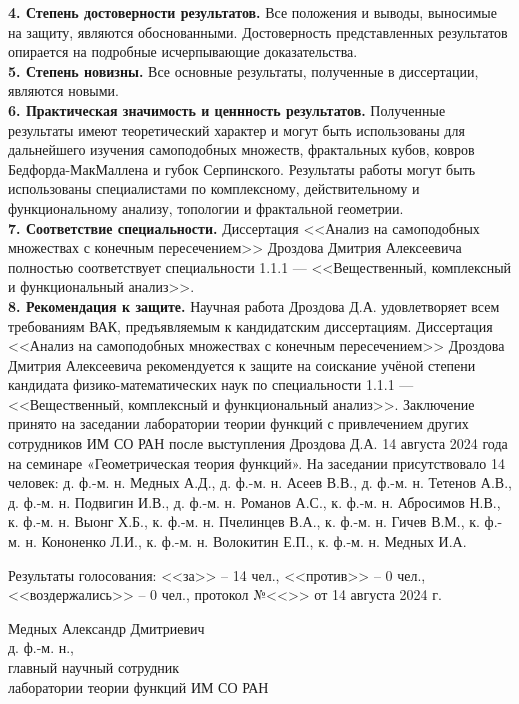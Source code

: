 \documentclass[14pt, a4paper]{extarticle}
\begin{document}
{\bf 4. Степень достоверности результатов.}
Все положения и выводы, выносимые на защиту, являются обоснованными.
Достоверность представленных результатов опирается на подробные исчерпывающие доказательства.\\

{\bf 5. Степень новизны.}
Все основные результаты, полученные в диссертации, являются новыми.\\

{\bf 6. Практическая значимость и ценнность результатов.}
Полученные результаты имеют теоретический характер и могут быть использованы для дальнейшего изучения самоподобных множеств, фрактальных кубов, ковров Бедфорда-МакМаллена и губок Серпинского.
Результаты работы могут быть использованы специалистами по комплексному, действительному и функциональному анализу, топологии и фрактальной геометрии.
\\

{\bf 7. Соответствие специальности.}
Диссертация <<Анализ на самоподобных множествах с конечным пересечением>> Дроздова Дмитрия Алексеевича полностью соответствует специальности 1.1.1 --- <<Вещественный, комплексный и функциональный анализ>>.\\


{\bf 8. Рекомендация к защите.}
Научная работа Дроздова Д.А. удовлетворяет всем требованиям ВАК, предъявляемым к кандидатским диссертациям.
Диссертация <<Анализ на самоподобных множествах с конечным пересечением>> Дроздова Дмитрия Алексеевича рекомендуется к защите на соискание учёной степени кандидата физико-математических наук по специальности 1.1.1 --- <<Вещественный, комплексный и функциональный анализ>>.
Заключение принято на заседании лаборатории теории функций с привлечением других сотрудников ИМ СО РАН после выступления Дроздова Д.А. 14 августа 2024 года на семинаре  «Геометрическая теория функций». 
На заседании присутствовало 14 человек:
д. ф.-м. н. Медных А.Д., 
д. ф.-м. н. Асеев В.В., 
д. ф.-м. н. Тетенов А.В., 
д. ф.-м. н. Подвигин И.В., 
д. ф.-м. н. Романов А.С., 
к. ф.-м. н. Абросимов Н.В., 
к. ф.-м. н. Выонг Х.Б., 
к. ф.-м. н. Пчелинцев В.А., 
к. ф.-м. н. Гичев В.М., 
к. ф.-м. н. Кононенко Л.И., 
к. ф.-м. н. Волокитин Е.П., 
к. ф.-м. н. Медных И.А.

Результаты голосования: <<за>> -- 14 чел., <<против>> -- 0 чел., <<воздержались>> -- 0 чел., протокол №<<\underline{\hspace{1cm}}>> от 14 августа 2024 г. 

\vspace{1cm}

\noindent Медных Александр Дмитриевич\\
\noindent д. ф.-м. н.,\\
\noindent главный научный сотрудник\\
\noindent лаборатории теории функций ИМ СО РАН\\

\end{document}
